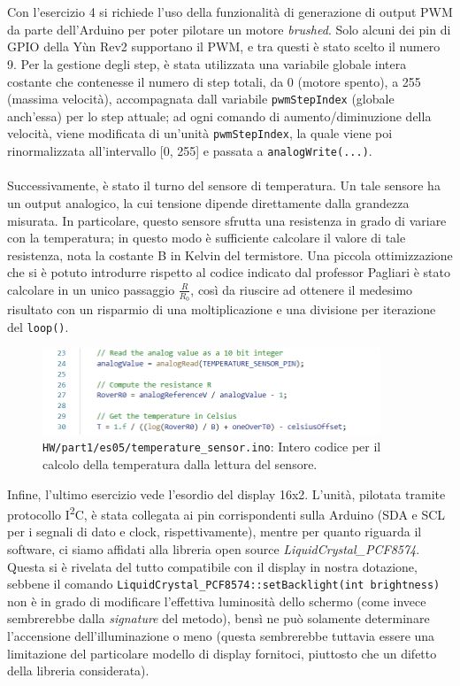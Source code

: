 \documentclass[12pt,a4paper]{article}
\begin{document}
\\ \\
Con l'esercizio 4 si richiede l'uso della funzionalità di generazione di output PWM da parte dell'Arduino per poter pilotare un motore \textit{brushed}. Solo alcuni dei pin di GPIO della Yùn Rev2 supportano il PWM, e tra questi è stato scelto il numero 9. Per la gestione degli step, è stata utilizzata una variabile globale intera costante che contenesse il numero di step totali, da 0 (motore spento), a 255 (massima velocità), accompagnata dall variabile \verb|pwmStepIndex| (globale anch'essa) per lo step attuale; ad ogni comando di aumento/diminuzione della velocità, viene modificata di un'unità \verb|pwmStepIndex|, la quale viene poi rinormalizzata all'intervallo [0, 255] e passata a \verb|analogWrite(...)|.
\\ \\
Successivamente, è stato il turno del sensore di temperatura. Un tale sensore ha un output analogico, la cui tensione dipende direttamente dalla grandezza misurata. In particolare, questo sensore sfrutta una resistenza in grado di variare con la temperatura; in questo modo è sufficiente calcolare il valore di tale resistenza, nota la costante B in Kelvin del termistore.
Una piccola ottimizzazione che si è potuto introdurre rispetto al codice indicato dal professor Pagliari è stato calcolare in un unico passaggio $\frac{R}{R_0}$, così da riuscire ad ottenere il medesimo risultato con un risparmio di una moltiplicazione e una divisione per iterazione del \verb|loop()|.
\begin{figure}[h]
    \centering
    \includegraphics[width=0.9\textwidth]{temperature_compute.png}
    \caption*{\texttt{HW/part1/es05/temperature\_sensor.ino}: Intero codice per il calcolo della tem\-pe\-ra\-tu\-ra dalla lettura del sensore.}
    \label{fig:temp_compute}
\end{figure}

Infine, l'ultimo esercizio vede l'esordio del display 16x2. L'unità, pilotata tramite protocollo I\textsuperscript{2}C, è stata collegata ai pin corrispondenti sulla Arduino (SDA e SCL per i segnali di dato e clock, rispettivamente), mentre per quanto riguarda il software, ci siamo affidati alla libreria open source \textit{LiquidCrystal\_PCF8574}. Questa si è rivelata del tutto compatibile con il display in nostra dotazione, sebbene il comando \verb|LiquidCrystal_PCF8574::setBacklight(int brightness)| non è in grado di modificare l'effettiva luminosità dello schermo (come invece sembrerebbe dalla \textit{signature} del metodo), bensì ne può solamente determinare l'accensione dell'illuminazione o meno (questa sembrerebbe tuttavia essere una limitazione del particolare modello di display fornitoci, piuttosto che un difetto della libreria considerata).
\end{document}

